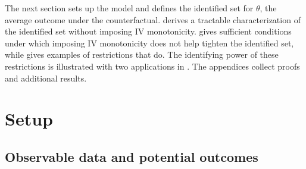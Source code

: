 \documentclass[12pt]{article}%
\theoremstyle{definition}
\newcommand\1{\operatorname{I}\indicatorfence}
\begin{document}
The next section sets up the model and defines the identified set for $\theta$,
the average outcome under the counterfactual.  derives
a tractable characterization of the identified set without imposing IV
monotonicity.  gives sufficient conditions under
which imposing IV monotonicity does not help tighten the identified set, while
 gives examples of restrictions that do. The
identifying power of these restrictions is illustrated with two applications in
. The appendices collect proofs and additional results.

\section{Setup}\label{subsection:idset}

\subsection{Observable data and potential outcomes}
\end{document}

